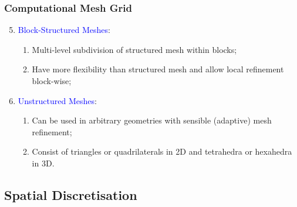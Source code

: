 \documentclass[10pt,compress]{beamer}
\begin{document}
\begin{frame}
 \frametitle{Computational Mesh Grid} 
 \begin{enumerate}
   \setcounter{enumi}{4}    
   \item <1-> \textcolor{blue}{Block-Structured Meshes}:
    \begin{enumerate}
       \item <2-> Multi-level subdivision of structured mesh within blocks; 
       \item <3-> Have more flexibility than structured mesh and allow local refinement block-wise;
    \end{enumerate}    
   \item <4-> \textcolor{blue}{Unstructured Meshes}:
    \begin{enumerate}
       \item <5-> Can be used in arbitrary geometries with sensible (adaptive) mesh refinement;
       \item <6-> Consist of triangles or quadrilaterals in 2D and tetrahedra or hexahedra in 3D.
    \end{enumerate}  
 \end{enumerate}  

\end{frame}



 
\subsection{Spatial Discretisation}
\end{document}
